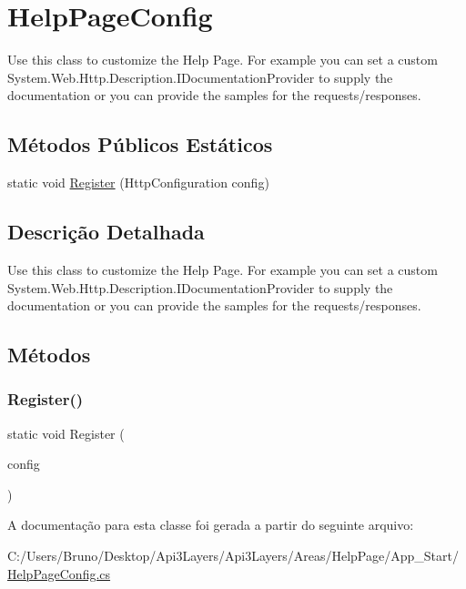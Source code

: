 \hypertarget{classApi3Layers_1_1Areas_1_1HelpPage_1_1HelpPageConfig}{}\section{Help\+Page\+Config}
\label{classApi3Layers_1_1Areas_1_1HelpPage_1_1HelpPageConfig}


Use this class to customize the Help Page. For example you can set a custom System.\+Web.\+Http.\+Description.\+I\+Documentation\+Provider to supply the documentation or you can provide the samples for the requests/responses.  


\subsection*{Métodos Públicos Estáticos}
\begin{DoxyCompactItemize}
\item 
static void \hyperlink{classApi3Layers_1_1Areas_1_1HelpPage_1_1HelpPageConfig_a8941f9a1c4d63842b463068258264cf4}{Register} (Http\+Configuration config)
\end{DoxyCompactItemize}


\subsection{Descrição Detalhada}
Use this class to customize the Help Page. For example you can set a custom System.\+Web.\+Http.\+Description.\+I\+Documentation\+Provider to supply the documentation or you can provide the samples for the requests/responses. 



\subsection{Métodos}
\mbox{\label{classApi3Layers_1_1Areas_1_1HelpPage_1_1HelpPageConfig_a8941f9a1c4d63842b463068258264cf4}} 
\subsubsection{\texorpdfstring{Register()}{Register()}}
{\footnotesize\ttfamily static void Register (\begin{DoxyParamCaption}\item[{Http\+Configuration}]{config }\end{DoxyParamCaption})\hspace{0.3cm}{\ttfamily [static]}}



A documentação para esta classe foi gerada a partir do seguinte arquivo\+:\begin{DoxyCompactItemize}
\item 
C\+:/\+Users/\+Bruno/\+Desktop/\+Api3\+Layers/\+Api3\+Layers/\+Areas/\+Help\+Page/\+App\+\_\+\+Start/\hyperlink{HelpPageConfig_8cs}{Help\+Page\+Config.\+cs}\end{DoxyCompactItemize}
